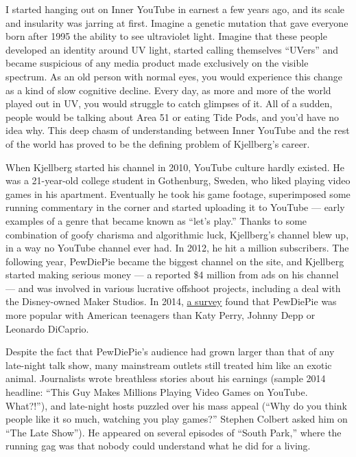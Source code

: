 I started hanging out on Inner YouTube in earnest a few years ago, and
its scale and insularity was jarring at first. Imagine a genetic
mutation that gave everyone born after 1995 the ability to see
ultraviolet light. Imagine that these people developed an identity
around UV light, started calling themselves ``UVers'' and became
suspicious of any media product made exclusively on the visible
spectrum. As an old person with normal eyes, you would experience this
change as a kind of slow cognitive decline. Every day, as more and more
of the world played out in UV, you would struggle to catch glimpses of
it. All of a sudden, people would be talking about Area 51 or eating
Tide Pods, and you'd have no idea why. This deep chasm of understanding
between Inner YouTube and the rest of the world has proved to be the
defining problem of Kjellberg's career.

When Kjellberg started his channel in 2010, YouTube culture hardly
existed. He was a 21-year-old college student in Gothenburg, Sweden, who
liked playing video games in his apartment. Eventually he took his game
footage, superimposed some running commentary in the corner and started
uploading it to YouTube --- early examples of a genre that became known
as ``let's play.'' Thanks to some combination of goofy charisma and
algorithmic luck, Kjellberg's channel blew up, in a way no YouTube
channel ever had. In 2012, he hit a million subscribers. The following
year, PewDiePie became the biggest channel on the site, and Kjellberg
started making serious money --- a reported \$4 million from ads on his
channel --- and was involved in various lucrative offshoot projects,
including a deal with the Disney-owned Maker Studios. In 2014,
\href{https://variety.com/2014/digital/news/survey-youtube-stars-more-popular-than-mainstream-celebs-among-u-s-teens-1201275245/}{a
survey} found that PewDiePie was more popular with American teenagers
than Katy Perry, Johnny Depp or Leonardo DiCaprio.

Despite the fact that PewDiePie's audience had grown larger than that of
any late-night talk show, many mainstream outlets still treated him like
an exotic animal. Journalists wrote breathless stories about his
earnings (sample 2014 headline: ``This Guy Makes Millions Playing Video
Games on YouTube. What?!''), and late-night hosts puzzled over his mass
appeal (``Why do you think people like it so much, watching you play
games?'' Stephen Colbert asked him on ``The Late Show''). He appeared on
several episodes of ``South Park,'' where the running gag was that
nobody could understand what he did for a living.

